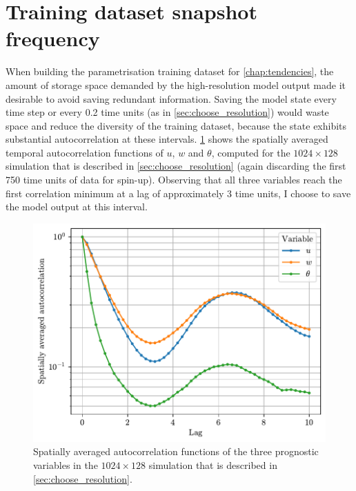 \documentclass[../main.tex]{subfiles}
\begin{document}
\clearpage
\section{Training dataset snapshot frequency} \label{sec:snapshot_freq}
When building the parametrisation training dataset for
\cref{chap:tendencies}, the amount of storage space demanded by the
high-resolution model output made it desirable to avoid saving redundant
information. Saving the model state every time step or every 0.2 time units
(as in \cref{sec:choose_resolution}) would waste space and reduce the
diversity of the training dataset, because the state exhibits substantial
autocorrelation at these intervals. \cref{fig:autocorr} shows the
spatially averaged temporal autocorrelation functions of $u$, $w$ and $\theta$,
computed for the $1024 \times 128$ simulation that is described in
\cref{sec:choose_resolution} (again discarding the first 750 time units of
data for spin-up). Observing that all three variables reach the first
correlation minimum at a lag of approximately 3 time units, I choose to
save the model output at this interval.

\begin{figure}[ht]
    \centering
    \includegraphics[width=0.6\linewidth]{figures/autocorrelation.pdf}
    \caption{
        Spatially averaged autocorrelation functions of the three prognostic
        variables in the $1024 \times 128$ simulation that is described in
        \cref{sec:choose_resolution}.
    }
    \label{fig:autocorr}
\end{figure}


\ifSubfilesClassLoaded{%
    \emergencystretch=5em
    \printbibliography{}
}{}
\end{document}
